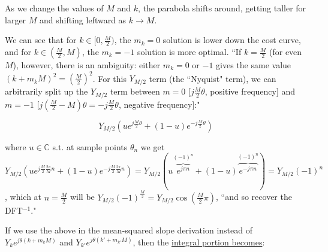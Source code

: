\documentclass[10pt]{article}
\begin{document}
\begin{center}
\end{center}

As we change the values of $M$ and $k$, the parabola shifts around, getting taller for larger $M$ and shifting leftward as $k \rightarrow M$.

We can see that for $k \in [0, \frac{M}{2})$, the $m_k = 0$ solution is lower down the cost curve, and for $k \in (\frac{M}{2}, M)$, the $m_k = -1$ solution is more optimal. ``If $k = \frac{M}{2}$ (for even $M$), however, there is an ambiguity: either $m_k = 0$ or $-1$ gives the same value $(k + m_k M)^2 = (\frac{M}{2})^2$. For this $Y_{M/2}$ term (the ``Nyquist" term), we can arbitrarily split up the $Y_{M/2}$ term between $m = 0$ [$j\frac{M}{2}\theta$, positive frequency] and $m = -1$ [$j(\frac{M}{2} - M)\theta = -j\frac{M}{2}\theta$, negative frequency]:"

$$ Y_{M/2}(ue^{j\frac{M}{2}\theta} + (1 - u)e^{-j\frac{M}{2}\theta}) $$

where $u \in \mathbb{C}$ s.t. at sample points $\theta_n$ we get $Y_{M/2}(ue^{j\frac{M}{2}\frac{2\pi}{M}n} + (1-u)e^{-j\frac{M}{2}\frac{2\pi}{M}n}) = Y_{M/2}(u\overbrace{e^{j\pi n}}^{(-1)^n} + (1-u)\overbrace{e^{-j\pi n}}^{(-1)^n}) = Y_{M/2}(-1)^n$, which at $n = \frac{M}{2}$ will be $Y_{M/2}(-1)^{\frac{M}{2}} = Y_{M/2}\cos(\frac{M}{2}\pi)$, ``and so recover the DFT$^{-1}$."

If we use the above in the mean-squared slope derivation instead of $Y_k e^{j \theta (k + m_k M)}$ and $Y_{k'} e^{j \theta (k' + m_{k'} M)}$, then the \href{https://math.stackexchange.com/a/5013632/278341}{integral portion becomes}:
\end{document}
